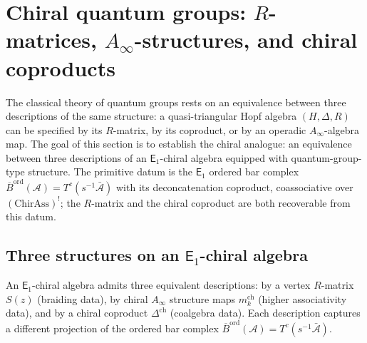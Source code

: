 \documentclass[11pt,reqno]{amsart}
\theoremstyle{definition}
\theoremstyle{remark}
\newcommand{\cA}{\mathcal{A}}
\newcommand{\Ainf}{A_{\infty}}
\newcommand{\Eone}{\mathsf{E}_{1}}
\newcommand{\Barord}{\overline{B}^{\mathrm{ord}}}
\numberwithin{equation}{section}
\begin{document}
\section{Chiral quantum groups: $R$-matrices, $\Ainf$-structures,
and chiral coproducts}
\label{sec:chiral-quantum-groups}

The classical theory of quantum groups rests on an equivalence
between three descriptions of the same structure: a
quasi-triangular Hopf algebra $(H, \Delta, R)$ can be
specified by its $R$-matrix, by its coproduct, or by an
operadic $\Ainf$-algebra map. The goal of this section is to
establish the chiral analogue: an equivalence between three
descriptions of an $\Eone$-chiral algebra equipped with
quantum-group-type structure. The primitive datum is the
$\Eone$ ordered bar complex
$\Barord(\cA) = T^c(s^{-1}\bar{\cA})$ with its
deconcatenation coproduct, coassociative over
$(\mathrm{ChirAss})^!$; the $R$-matrix and the chiral
coproduct are both recoverable from this datum.

\subsection{Three structures on an $\Eone$-chiral algebra}
\label{subsec:three-structures}

An $\Eone$-chiral algebra admits three equivalent
descriptions: by a vertex $R$-matrix $S(z)$ (braiding data),
by chiral $\Ainf$ structure maps $m_k^{\mathrm{ch}}$
(higher associativity data), and by a chiral coproduct
$\Delta^{\mathrm{ch}}$ (coalgebra data). Each description
captures a different projection of the ordered bar complex
$\Barord(\cA) = T^c(s^{-1}\bar{\cA})$.
\end{document}
